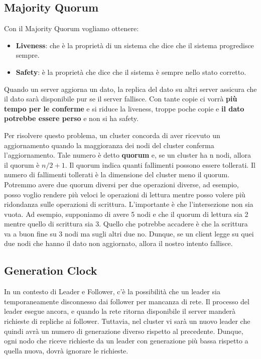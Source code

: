 \subsection{Majority Quorum}
Con il Majority Quorum vogliamo ottenere:
\begin{itemize}
    \item \textbf{Liveness}: che è la proprietà di un sistema che dice che il sistema progredisce sempre.
    \item \textbf{Safety}: è la proprietà che dice che il sistema è sempre nello stato corretto. 
\end{itemize}
Quando un server aggiorna un dato, la replica del dato su altri server assicura che il dato sarà disponibile pur se il server fallisce. Con tante copie ci vorrà \textbf{più tempo per le conferme} e si riduce la liveness, troppe poche copie e \textbf{il dato potrebbe essere perso} e non si ha safety. 

Per risolvere questo problema, un cluster concorda di aver ricevuto un aggiornamento quando la maggioranza dei nodi del cluster conferma l'aggiornamento. Tale numero è detto \textbf{quorum} e, se un cluster ha n nodi, allora il quorum è $n/2+1$. 
Il quorum indica quanti fallimenti possono essere tollerati. Il numero di fallimenti tollerati è la dimensione del cluster meno il quorum.
Potremmo avere due quorum diversi per due operazioni diverse, ad esempio, posso voglio rendere più veloci le operazioni di lettura mentre posso volere più ridondanza sulle operazioni di scrittura. L'importante è che l'intersezione non sia vuota. Ad esempio, supponiamo di avere 5 nodi e che il quorum di lettura sia 2 mentre quello di scrittura sia 3. Quello che potrebbe accadere è che la scrittura va a buon fine su 3 nodi ma sugli altri due no. Dunque, se un client legge su quei due nodi che hanno il dato non aggiornato, allora il nostro intento fallisce. 

\subsection{Generation Clock}
In un contesto di Leader e Follower, c’è la possibilità che un leader sia temporaneamente disconnesso dai follower per mancanza di rete. Il processo del leader esegue ancora, e quando la rete ritorna disponibile il server manderà richieste di repliche ai follower. Tuttavia, nel cluster vi sarà un nuovo leader che quindi avrà un numero di generazione diverso rispetto al precedente.
Dunque, ogni nodo che riceve richieste da un leader con generazione più bassa rispetto a quella nuova, dovrà ignorare le richieste.

